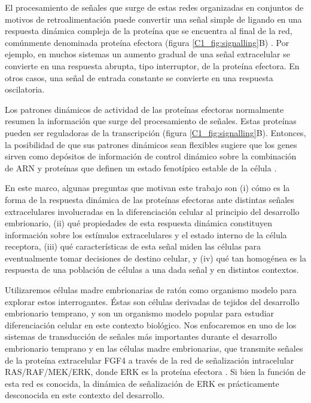 \documentclass[./main.tex]{subfiles}
\begin{document}
El procesamiento de señales que surge de estas redes organizadas en conjuntos de motivos de retroalimentación puede convertir una señal simple de ligando en una respuesta dinámica compleja de la proteína que se encuentra al final de la red, comúnmente denominada proteína efectora  (figura \ref{C1_fig:signalling}B) \cite{Antebi2017,Santos2007}. Por ejemplo, en muchos sistemas un aumento gradual de una señal extracelular se convierte en una respuesta abrupta, tipo interruptor, de la proteína efectora. En otros casos, una señal de entrada constante se convierte en una respuesta oscilatoria. 


Los patrones dinámicos de actividad de las proteínas efectoras normalmente resumen la información que surge del procesamiento de señales. Estas proteínas pueden ser reguladoras de la transcripción (figura \ref{C1_fig:signalling}B). Entonces, la posibilidad de que sus patrones dinámicos sean flexibles sugiere que los genes sirven como depósitos de información de control dinámico sobre la combinación de ARN y proteínas que definen un estado fenotípico estable de la célula \cite{Koseska2017}.


En este marco, algunas preguntas que motivan este trabajo son (i) cómo es la forma de la respuesta dinámica de las proteínas efectoras ante distintas señales extracelulares involucradas en la diferenciación celular al principio del desarrollo embrionario, (ii) qué propiedades de esta respuesta dinámica constituyen información sobre los estímulos extracelulares y el estado interno de la célula receptora, (iii) qué características de esta señal miden las células para eventualmente tomar decisiones de destino celular, y (iv) qué tan homogénea es la respuesta de una población de células a una dada señal y en distintos contextos. 


Utilizaremos células madre embrionarias de ratón como organismo modelo para explorar estos interrogantes. Éstas son células derivadas de tejidos del desarrollo embrionario temprano, y son un organismo modelo popular para estudiar diferenciación celular en este contexto biológico. Nos enfocaremos en uno de los sistemas de transducción de señales más importantes durante el desarrollo embrionario temprano y en las células madre embrionarias, que transmite señales de la proteína extracelular FGF4 a través de la red de señalización intracelular RAS/RAF/MEK/ERK, donde ERK es la proteína efectora \cite{Brewer2016}. Si bien la función de esta red es conocida, la dinámica de señalización de ERK es prácticamente desconocida en este contexto del desarrollo. 
\end{document}
